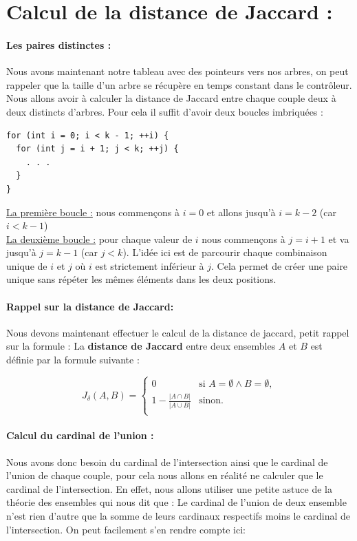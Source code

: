 \documentclass{article}
\begin{document}
\newpage{}

\section{Calcul de la distance de Jaccard :}\label{subsec:jdis}
\paragraph{Les paires distinctes :}
Nous avons maintenant notre tableau avec des pointeurs vers nos arbres, on peut
rappeler que la taille d'un arbre se récupère en temps constant dans le contrôleur.
Nous allons avoir à calculer la distance de Jaccard entre chaque couple deux à deux
distincts d'arbres. Pour cela il suffit d'avoir deux boucles imbriquées : 
\begin{lstlisting}[style=Cstyle]
for (int i = 0; i < k - 1; ++i) {
  for (int j = i + 1; j < k; ++j) {
    . . .
  }
}  
\end{lstlisting}
\underline{La première boucle :} nous commençons à $i = 0$ et allons jusqu'à $i = k - 2$ (car $i < k - 1$)\\
\underline{La deuxième boucle :} pour chaque valeur de $i$ nous commençons à $j = i + 1$ et va 
jusqu'à $j = k - 1$ (car $j < k$).
L'idée ici est de parcourir chaque combinaison unique de $i$ et $j$ où $i$ est strictement inférieur à $j$. 
Cela permet de créer une paire unique sans répéter les mêmes éléments dans les deux positions.

\paragraph{Rappel sur la distance de Jaccard:}
Nous devons maintenant effectuer le calcul de la distance de jaccard, petit rappel sur la formule :
La \textbf{distance de Jaccard} entre deux ensembles \( A \) et \( B \) est définie par la formule suivante :

\[
J_{\delta}(A, B) = 
\begin{cases} 
0 & \text{si } A = \emptyset \wedge B = \emptyset, \\
1 - \frac{|A \cap B|}{|A \cup B|} & \text{sinon.} \\
\end{cases}
\]

\paragraph{Calcul du cardinal de l'union :}
Nous avons donc besoin du cardinal de l'intersection ainsi que le cardinal de l'union de chaque couple,
pour cela nous allons en réalité ne calculer que le cardinal de l'intersection. En effet, nous allons utiliser
une petite astuce de la théorie des ensembles qui nous dit que : Le cardinal de l'union de deux ensemble n'est rien d'autre
que la somme de leurs cardinaux respectifs moins le cardinal de l'intersection. On peut facilement s'en rendre compte ici:
\end{document}

